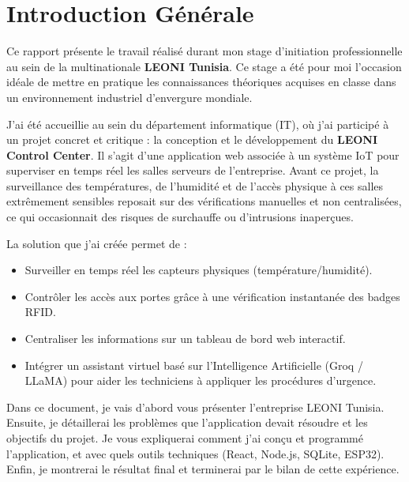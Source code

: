 \documentclass[12pt,a4paper]{report}
\begin{document}
\chapter*{Introduction Générale}
Ce rapport présente le travail réalisé durant mon stage d'initiation professionnelle au sein de la multinationale \textbf{LEONI Tunisia}. Ce stage a été pour moi l'occasion idéale de mettre en pratique les connaissances théoriques acquises en classe dans un environnement industriel d'envergure mondiale.

J'ai été accueillie au sein du département informatique (IT), où j'ai participé à un projet concret et critique : la conception et le développement du \textbf{LEONI Control Center}. Il s'agit d'une application web associée à un système IoT pour superviser en temps réel les salles serveurs de l'entreprise. Avant ce projet, la surveillance des températures, de l'humidité et de l'accès physique à ces salles extrêmement sensibles reposait sur des vérifications manuelles et non centralisées, ce qui occasionnait des risques de surchauffe ou d'intrusions inaperçues.

La solution que j'ai créée permet de :
\begin{itemize}
    \item Surveiller en temps réel les capteurs physiques (température/humidité).
    \item Contrôler les accès aux portes grâce à une vérification instantanée des badges RFID.
    \item Centraliser les informations sur un tableau de bord web interactif.
    \item Intégrer un assistant virtuel basé sur l'Intelligence Artificielle (Groq / LLaMA) pour aider les techniciens à appliquer les procédures d'urgence.
\end{itemize}

Dans ce document, je vais d'abord vous présenter l'entreprise LEONI Tunisia. Ensuite, je détaillerai les problèmes que l'application devait résoudre et les objectifs du projet. Je vous expliquerai comment j'ai conçu et programmé l'application, et avec quels outils techniques (React, Node.js, SQLite, ESP32). Enfin, je montrerai le résultat final et terminerai par le bilan de cette expérience.

\end{document}
